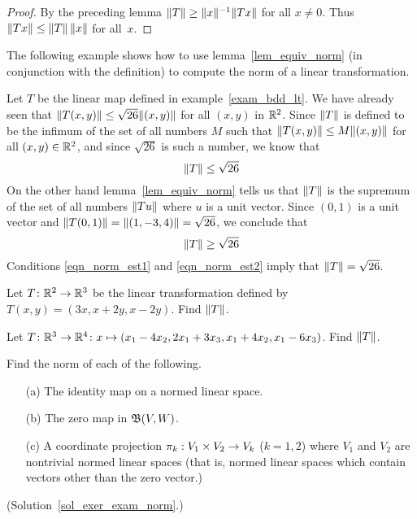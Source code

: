\begin{proof} By the preceding lemma $\lVert T\rVert \ge \lVert x\rVert^{-1}\lVert Tx\rVert$ for all $x \ne 0$.  Thus
$\lVert Tx\rVert \le \lVert T\rVert \,\lVert x\rVert$ for all~$x$.
\end{proof}


The following example shows how to use lemma~\ref{lem_equiv_norm} (in conjunction with the
definition) to compute the norm of a linear transformation.

\begin{exam} Let $T$ be the linear map defined in example~\ref{exam_bdd_lt}.  We have already seen that
$\lVert T(x,y)\rVert \le \sqrt{26}\lVert(x,y)\rVert$ for all $(x,y)$ in $\mathbb{R}^2$.  Since $\lVert T\rVert$ is
defined to be the infimum of the set of all numbers $M$ such that $\lVert T(x,y)\rVert \le M
\lVert(x,y)\rVert$ for all $(x,y) \in \mathbb{R}^2$, and since $\sqrt{26}$ is such a number, we know that
  \begin{equation}\label{eqn_norm_est1} \lVert T\rVert \le \sqrt{26}
  \end{equation}
On the other hand lemma~\ref{lem_equiv_norm} tells us that $\lVert T\rVert$ is the supremum of the
set of all numbers $\lVert Tu\rVert$ where $u$ is a unit vector. Since $(0,1)$ is a unit vector and
$\lVert T(0,1)\rVert = \lVert(1,-3,4)\rVert = \sqrt{26}$, we conclude that
  \begin{equation}\label{eqn_norm_est2} \lVert T\rVert \ge \sqrt{26}
  \end{equation}
Conditions \eqref{eqn_norm_est1} and \eqref{eqn_norm_est2} imply that $\lVert T\rVert = \sqrt{26}$.
\end{exam}

\begin{prob} Let $T\colon \mathbb{R}^2 \rightarrow \mathbb{R}^3$ be the linear transformation defined by $T(x,y) =
(3x, x + 2y, x - 2y)$.  Find $\lVert T\rVert$.
\end{prob}

\begin{prob} Let $T\colon \mathbb{R}^3 \rightarrow \mathbb{R}^4\colon x \mapsto (x_1 - 4x_2, 2x_1 + 3x_3, x_1 + 4x_2,
x_1- 6x_3)$.  Find $\lVert T\rVert$.
\end{prob}

\begin{exer}\label{exer_exam_norm}  Find the norm of each of the
following.
 \begin{enumerate}
  \item[(a)] The identity map on a normed linear space.
  \item[(b)] The zero map in $\mathfrak{B}(V,W)$.
  \item[(c)] A coordinate projection $\pi_k: V_1 \times V_2 \rightarrow V_k$
($k = 1,2$) where $V_1$ and $V_2$ are nontrivial normed linear spaces (that is, normed linear
spaces which contain vectors other than the zero vector.)
 \end{enumerate}
(Solution~\ref{sol_exer_exam_norm}.)
\end{exer}

